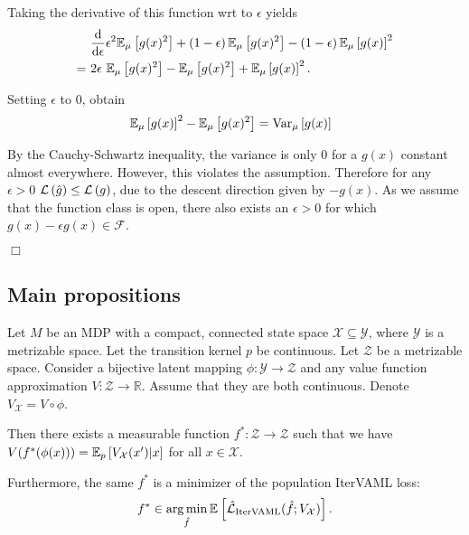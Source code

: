 Taking the derivative of this function wrt to $\epsilon$ yields
\begin{align*}
     &~\frac{\mathrm{d}}{\mathrm{d} \epsilon}\epsilon^2 \mathbb{E}_\mu\left[ g(x)^2 \right] + \left( 1-\epsilon \right)\mathbb{E}_\mu\left[ g(x)^2 \right] - \left( 1 - \epsilon \right) \mathbb{E}_\mu\left[ g(x) \right]^2\\
     =&~2\epsilon~\mathbb{E}_\mu\left[ g(x)^2 \right] -\mathbb{E}_\mu\left[ g(x)^2 \right] + \mathbb{E}_\mu\left[ g(x) \right]^2.
\end{align*}

Setting $\epsilon$ to 0, obtain
\begin{align*}
     &~\mathbb{E}_\mu\left[ g(x) \right]^2 - \mathbb{E}_\mu\left[ g(x)^2 \right] = \text{Var}_\mu\left[ g(x) \right]
\end{align*}

By the Cauchy-Schwartz inequality, the variance is only $0$ for a $g(x)$ constant almost everywhere. However, this violates the assumption.
Therefore for any $\epsilon > 0$ $\mathcal{L}\left( \hat{g} \right) \leq \mathcal{L}\left( g \right)$, due to the descent direction given by $-g(x)$.
As we assume that the function class is open, there also exists an $\epsilon > 0$ for which $g(x) - \epsilon g(x) \in \mathcal{F}$.

\hfill \ensuremath{\Box}


\subsection{Main propositions}
\label{app:main_proofs}

\begin{proposition}
    Let $M$ be an MDP with a compact, connected state space $\mathcal{X} \subseteq \mathcal{Y}$, where $\mathcal{Y}$ is a metrizable space. Let the transition kernel $p$ be continuous. Let $\mathcal{Z}$ be a metrizable space. Consider a bijective latent mapping $\phi: \mathcal{Y} \rightarrow \mathcal{Z}$ and any value function approximation $V: \mathcal{Z} \rightarrow \mathbb{R}$. Assume that they are both continuous. Denote $V_\mathcal{X} = V \circ \phi$.
    
    Then there exists a measurable function $f^*: \mathcal{Z} \rightarrow \mathcal{Z}$ such that we have $V(f^*(\phi(x))) = \mathbb{E}_{p}\left[  V_\mathcal{X}(x')|x \right]$ for all $x \in \mathcal{X}$.
    
    Furthermore, the same $f^*$ is a minimizer of the population IterVAML loss:
    \begin{align*}
        f^* \in \operatorname*{arg\,min}_{\hat{f}} \mathbb{E}_{}\left[  \hat{\mathcal{L}}_\text{IterVAML}(\hat{f};V_\mathcal{X}) \right].
    \end{align*}
\end{proposition}

